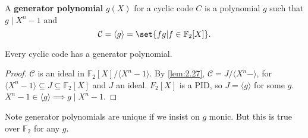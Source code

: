 \documentclass{article}
\newcommand{\F}{\mathbb{F}}
\newcommand{\1}[1]{\mathbbm{1}_{#1}}
\begin{document}
\begin{defi}
    A \textbf{generator polynomial} $g(X)$ for a cyclic code $C$ is a polynomial $g$ such that $g \mid X^n - 1$ and
    \begin{equation*}
        \mathcal{C} = \langle g \rangle = \set{f g | f \in \F_2[X]}.
    \end{equation*}
\end{defi}
\begin{nthm}\label{thm:2.30}
    Every cyclic code has a generator polynomial.
\end{nthm}
\begin{proof}
    $\mathcal{C}$ is an ideal in $\F_2[X] / \langle X^n - 1 \rangle$.
    By \cref{lem:2.27}, $\mathcal{C} = J/\langle X^n - \rangle$, for $\langle X^n - 1 \rangle \subseteq J \subseteq \F_2[X]$ and $J$ an ideal.
    $F_2[X]$ is a PID, so $J = \langle g \rangle$ for some $g$. $X^n - 1 \in \langle g \rangle \implies g \mid X^n - 1$.
\end{proof}
Note generator polynomials are unique if we insist on $g$ monic.
But this is true over $\F_2$ for any $g$.
\end{document}
